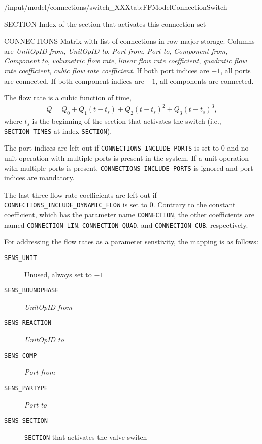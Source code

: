 \begin{groupscope}{/input/model/connections/switch\_XXX}{tab:FFModelConnectionSwitch}
  \begin{dataset}[type=int,range={$\geq 0$},length=1]{SECTION}
    Index of the section that activates this connection set
  \end{dataset}
  \begin{dataset}[type=double,range={$\geq -1$},length={$\{5,7,8,10\} \cdot \texttt{NCONNECTIONS}$}]{CONNECTIONS}
    Matrix with list of connections in row-major storage.
    Columns are \emph{UnitOpID from}, \emph{UnitOpID to}, \emph{Port from}, \emph{Port to}, \emph{Component from}, \emph{Component to}, \emph{volumetric flow rate}, \emph{linear flow rate coefficient}, \emph{quadratic flow rate coefficient}, \emph{cubic flow rate coefficient}.
    If both port indices are $-1$, all ports are connected.
    If both component indices are $-1$, all components are connected.

    The flow rate is a cubic function of time,
    \begin{align*}
      Q = Q_0 + Q_1(t - t_s) + Q_2(t-t_s)^2 + Q_3(t-t_s)^3,
    \end{align*}
    where $t_s$ is the beginning of the section that activates the switch (i.e., \texttt{SECTION\_TIMES} at index \texttt{SECTION}).

    The port indices are left out if \texttt{CONNECTIONS\_INCLUDE\_PORTS} is set to $0$ and no unit operation with multiple ports is present in the system.
    If a unit operation with multiple ports is present, \texttt{CONNECTIONS\_INCLUDE\_PORTS} is ignored and port indices are mandatory.

    The last three flow rate coefficients are left out if \texttt{CONNECTIONS\_INCLUDE\_DYNAMIC\_FLOW} is set to $0$.
    Contrary to the constant coefficient, which has the parameter name \texttt{CONNECTION}, the other coefficients are named \texttt{CONNECTION\_LIN}, \texttt{CONNECTION\_QUAD}, and \texttt{CONNECTION\_CUB}, respectively.

    For addressing the flow rates as a parameter senstivity, the mapping is as follows:
    \begin{description}
      \item[\texttt{SENS\_UNIT}] Unused, always set to $-1$
      \item[\texttt{SENS\_BOUNDPHASE}] \emph{UnitOpID from}
      \item[\texttt{SENS\_REACTION}] \emph{UnitOpID to}
      \item[\texttt{SENS\_COMP}] \emph{Port from}
      \item[\texttt{SENS\_PARTYPE}] \emph{Port to}
      \item[\texttt{SENS\_SECTION}] \texttt{SECTION} that activates the valve switch
    \end{description}\vspace{-\baselineskip}
  \end{dataset}
\end{groupscope}

